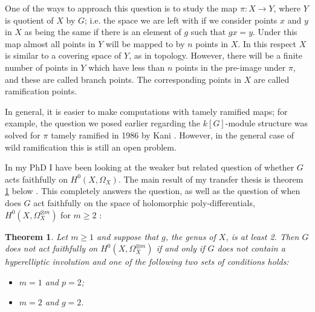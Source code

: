 \documentclass[draft, 11pt, notitlepage]{article} %
\theoremstyle{plain}
\newtheorem{thm}[defn]{Theorem}
\theoremstyle{remark}
\begin{document}
One of the ways to approach this question is to study the map $\pi:X\rightarrow Y$, where $Y$ is quotient of $X$ by $G$; i.e. the space we are left with if we consider points $x$ and $y$ in $X$ as being the same if there is an element of $g$ such that $gx = y$.
Under this map almost all points in $Y$ will be mapped to by $n$ points in $X$.
In this respect $X$ is similar to a covering space of $Y$, as in topology.
However, there will be a finite number of points in $Y$ which have less than $n$ points in the pre-image under $\pi$, and these are called branch points.
The corresponding points in $X$ are called ramification points.


In general, it is easier to make computations with tamely ramified maps; for example, the question we posed earlier regarding the $k[G]$-module structure was solved for $\pi$ tamely ramified in 1986 by Kani \cite{Kani}. However, in the general case of wild ramification this is still an open problem.

In my PhD I have been looking at the weaker but related question of whether $G$ acts faithfully on $H^0(X,\Omega_X)$. 
The main result of my transfer thesis is theorem \ref{theorem} below \cite{faithfulaction}.
This completely answers the question, as well as the question of when does $G$ act faithfully on the space of holomorphic poly-differentials, $H^0(X,\Omega_X^{\otimes m})$ for $m\geq 2$ :\\

\begin{thm}\label{theorem}
Let $m\geq 1$ and suppose that $g$, the genus of $X$, is at least 2.
Then $G$ does not act faithfully on $H^0(X,\Omega_X^{\otimes m})$ if and only if $G$ does not contain a hyperelliptic involution and one of the following two sets of conditions holds:
 \begin{itemize}
\item $m=1$ and $p=2$;
\item $m=2$ and $g=2$.
\end{itemize}
\end{thm}
\end{document}
